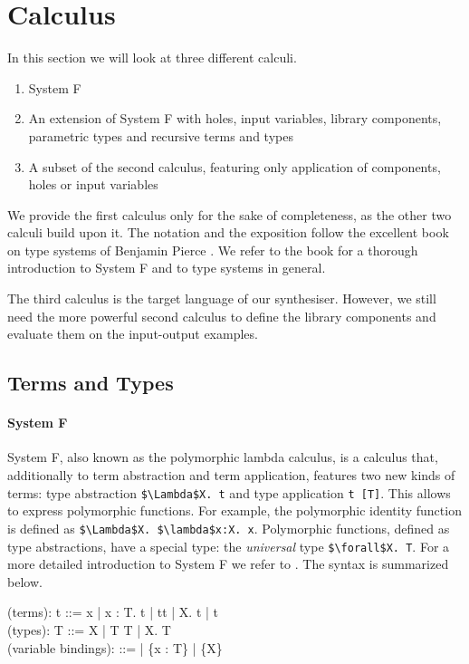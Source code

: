 \section{Calculus}
In this section we will look at three different calculi.
\begin{enumerate}[1.]
\item System F
\item An extension of System F with holes, input variables, library components, parametric types and recursive terms and types
\item A subset of the second calculus, featuring only application of components, holes or input variables
\end{enumerate}

We provide the first calculus only for the sake of completeness, as the other two calculi build upon it. The notation and the exposition follow the excellent book on type systems of Benjamin Pierce \cite{pierce2002types}. We refer to the book for a thorough introduction to System F and to type systems in general.

The third calculus is the target language of our synthesiser. However, we still need the more powerful second calculus to define the library components and evaluate them on the input-output examples.


  \subsection{Terms and Types}\label{Term and types}
\paragraph{System F} System F, also known as the polymorphic lambda calculus, is a calculus that, additionally to term abstraction and term application, features two new kinds of terms: type abstraction \lstinline!$\Lambda$X. t! and type application \lstinline!t [T]!. This allows to express polymorphic functions. For example, the polymorphic identity function is defined as \lstinline!$\Lambda$X. $\lambda$x:X. x!.
Polymorphic functions, defined as type abstractions, have a special type: the \emph{universal} type \lstinline!$\forall$X. T!. For a more detailed introduction to System F we refer to \cite{pierce2002types}. The syntax is summarized below.

 \begin{plstx}
(terms): t ::= x | \lambda x : T.\; t | t\;t | \Lambda X.\; t | t\;[T]\\
(types): T ::= X | T \rightarrow T | \forall X.\; T\\
(variable bindings): \Gamma ::= \emptyset | \Gamma \cup \{x : T\} | \Gamma \cup \{X\}\\
\end{plstx}


